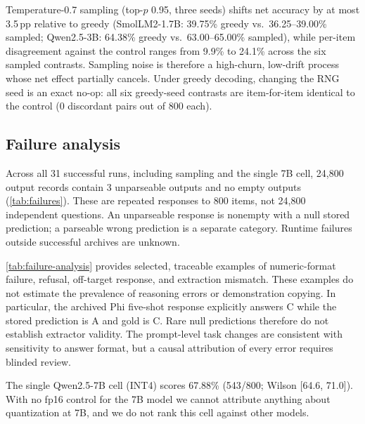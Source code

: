 Temperature-0.7 sampling (top-$p$ 0.95, three seeds) shifts net
accuracy by at most 3.5\,pp relative to greedy (SmolLM2-1.7B: 39.75\%
greedy vs.\ 36.25--39.00\% sampled; Qwen2.5-3B: 64.38\% greedy vs.\
63.00--65.00\% sampled), while per-item disagreement against the
control ranges from 9.9\% to 24.1\% across the six sampled contrasts.
Sampling noise is therefore a high-churn, low-drift process whose net
effect partially cancels. Under greedy decoding, changing the RNG seed
is an exact no-op: all six greedy-seed contrasts are item-for-item
identical to the control (0 discordant pairs out of 800 each).

\subsection{Failure analysis}
\label{sec:failures}

Across all 31 successful runs, including sampling and the single 7B cell,
24,800 output records contain 3 unparseable outputs and no empty outputs
(\cref{tab:failures}). These are repeated responses to 800 items, not
24,800 independent questions. An unparseable response is nonempty with a
null stored prediction; a parseable wrong prediction is a separate category.
Runtime failures outside successful archives are unknown.


\cref{tab:failure-analysis} provides selected, traceable examples of
numeric-format failure, refusal, off-target response, and extraction
mismatch. These examples do not estimate the prevalence of reasoning
errors or demonstration copying. In particular, the archived Phi five-shot
response explicitly answers C while the stored prediction is A and gold is C.
Rare null predictions therefore do not establish extractor validity.
The prompt-level task changes are consistent with sensitivity to answer
format, but a causal attribution of every error requires blinded review.

The single Qwen2.5-7B cell (INT4) scores 67.88\% (543/800; Wilson
[64.6, 71.0]). With no fp16 control for the 7B model we cannot
attribute anything about quantization at 7B, and we do not rank this
cell against other models.


